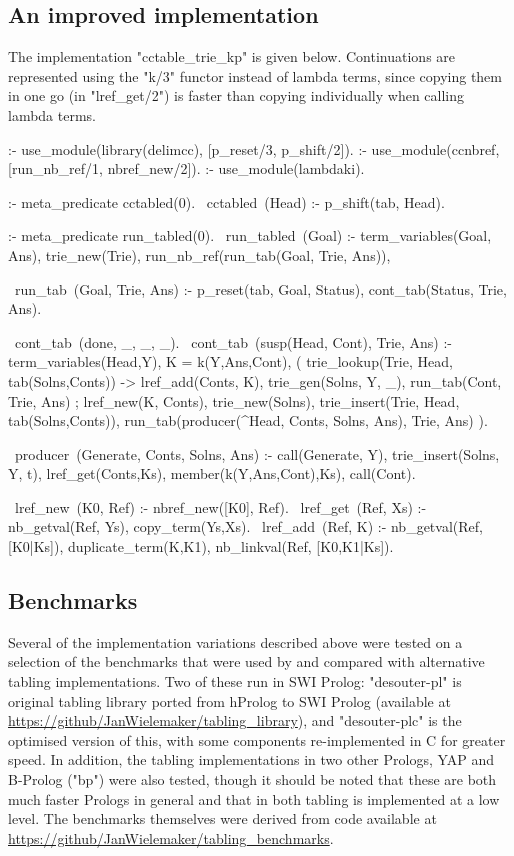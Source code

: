 \subsection{An improved implementation}

The implementation "cctable_trie_kp" is given below. Continuations are represented using
the "k/3" functor instead of lambda terms, since copying them in one go (in "lref_get/2") is faster
than copying individually when calling lambda terms. 
\begin{prolog-framed}[name=cctable8,numbers=left]
  :- use_module(library(delimcc), [p_reset/3, p_shift/2]).
  :- use_module(ccnbref, [run_nb_ref/1, nbref_new/2]).
  :- use_module(lambdaki).
        
  :- meta_predicate cctabled(0). 
  ~cctabled~(Head) :- p_shift(tab, Head).

  :- meta_predicate run_tabled(0). 
  ~run_tabled~(Goal) :-
     term_variables(Goal, Ans), trie_new(Trie),
     run_nb_ref(run_tab(Goal, Trie, Ans)),

  ~run_tab~(Goal, Trie, Ans) :-
     p_reset(tab, Goal, Status),
     cont_tab(Status, Trie, Ans).

  ~cont_tab~(done, _, _, _).
  ~cont_tab~(susp(Head, Cont), Trie, Ans) :-  
     term_variables(Head,Y), K = k(Y,Ans,Cont),
     (  trie_lookup(Trie, Head, tab(Solns,Conts))
     -> lref_add(Conts, K),
        trie_gen(Solns, Y, _),
        run_tab(Cont, Trie, Ans)
     ;  lref_new(K, Conts),
        trie_new(Solns),
        trie_insert(Trie, Head, tab(Solns,Conts)),
        run_tab(producer(\Y^Head, Conts, Solns, Ans), Trie, Ans)
     ).

  ~producer~(Generate, Conts, Solns, Ans) :-
     call(Generate, Y),
     trie_insert(Solns, Y, t),
     lref_get(Conts,Ks), member(k(Y,Ans,Cont),Ks),
     call(Cont).

  ~lref_new~(K0, Ref) :- nbref_new([K0], Ref).
  ~lref_get~(Ref, Xs) :- nb_getval(Ref, Ys), copy_term(Ys,Xs).
  ~lref_add~(Ref, K) :- 
    nb_getval(Ref, [K0|Ks]), duplicate_term(K,K1), 
    nb_linkval(Ref, [K0,K1|Ks]).
\end{prolog-framed}

\subsection{Benchmarks}

Several of the implementation variations described above were tested on a selection
of the benchmarks that were used by \cite{DesouterVan-DoorenSchrijvers2015} and
compared with alternative tabling implementations. Two of these run in SWI Prolog:
"desouter-pl" is  original tabling library
ported from hProlog to SWI Prolog (available at \url{https://github/JanWielemaker/tabling_library}),
and "desouter-plc" is the optimised version of this, with some components re-implemented
in C for greater speed. In addition, the tabling implementations in two other Prologs,
YAP and B-Prolog ("bp") were also tested, though it should be noted that these are both
much faster Prologs in general and that in both tabling is implemented at a low level.
The benchmarks themselves were derived from code available at \url{https://github/JanWielemaker/tabling_benchmarks}.

